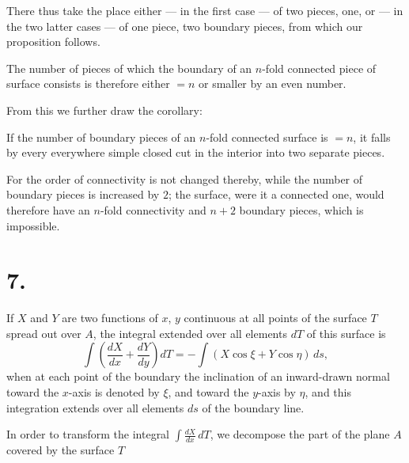 \documentclass{article}
\begin{document}
There thus take the place either --- in the first case --- of two pieces, one, or --- in the two latter cases --- of one piece, two boundary pieces, from which our proposition follows.

The number of pieces of which the boundary of an $n$-fold connected piece of surface consists is therefore either $= n$ or smaller by an even number.

From this we further draw the corollary:

If the number of boundary pieces of an $n$-fold connected surface is $= n$, it falls by every everywhere simple closed cut in the interior into two separate pieces.

For the order of connectivity is not changed thereby, while the number of boundary pieces is increased by $2$; the surface, were it a connected one, would therefore have an $n$-fold connectivity and $n+2$ boundary pieces, which is impossible.

\section*{7.}

If $X$ and $Y$ are two functions of $x$, $y$ continuous at all points of the surface $T$ spread out over $A$, the integral extended over all elements $dT$ of this surface is
\[
\int \left(\frac{dX}{dx} + \frac{dY}{dy}\right) dT = -\int (X\cos\xi + Y\cos\eta)\,ds,
\]
when at each point of the boundary the inclination of an inward-drawn normal toward the $x$-axis is denoted by $\xi$, and toward the $y$-axis by $\eta$, and this integration extends over all elements $ds$ of the boundary line.

In order to transform the integral $\displaystyle\int \frac{dX}{dx}\,dT$, we decompose the part of the plane $A$ covered by the surface $T$
\end{document}
